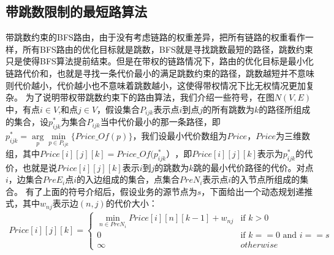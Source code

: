 \subsection{带跳数限制的最短路算法}
  带跳数约束的BFS路由，由于没有考虑链路的权重差异，把所有链路的权重看作一样，所有BFS路由的优化目标就是跳数，BFS就是寻找跳数最短的路径，跳数约束只是使得BFS算法提前结束。但是在带权的链路情况下，路由的优化目标是最小化链路代价和，也就是寻找一条代价最小的满足跳数约束的路径，跳数越短并不意味则代价越小，代价越小也不意味着跳数越小，这使得带权情况下比无权情况更加复杂。
  为了说明带权带跳数约束下的路由算法，我们介绍一些符号，在图$N(V,E)$中，有点$i \in V$,和点$j \in V$，假设集合$P_{ijk}$表示点$i$到点$j$的所有跳数为$k$的路径所组成的集合，设$p_{ijk}^*$为集合$P_{ijk}$当中代价最小的那一条路径，即$p_{ijk}^* =\arg\limits_{p}\min\limits_{p \in P_{ijk}}\{Price\_Of(p)\}$，我们设最小代价数组为$Price$，$Price$为三维数组，其中$Price[i][j][k]=Price\_Of(p_{ijk}^*）$，即$Price[i][j][k]$表示为$p_{ijk}^*$的代价，也就是说$Price[i][j][k]$表示$i$到$j$的跳数为$k$跳的最小代价路径的代价。对点$i$，边集合$PreE_i$点$i$的入边组成的集合，点集合$PreN_i$表示点$i$的入节点所组成的集合。
  有了上面的符号介绍后，假设业务的源节点为$s$，下面给出一个动态规划递推式，其中$w_{nj}$表示边$(n,j)$的代价大小：
\begin{equation}\label{FlowConv2}
\begin{split}
Price[i][j][k]
=\begin{cases}
\min\limits_{n \in PreN_i}{Price[i][n][k-1]+w_{nj}} & \text{if $k>0$}\\
0 & \text{if $k==0$ and $i==s $} \\
\infty &{otherwise}
\end{cases}
\end{split}
\end{equation}
